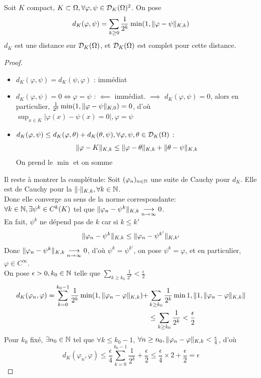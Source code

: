 \documentclass[]{report}
\begin{document}
    \begin{prop}{}{}
        Soit $K$ compact, $K\subset \Omega,\forall \varphi,\psi\in\mathcal{D}_K(\Omega)^2$. On pose 
        \[d_K(\varphi,\psi)=\sum_{k\ge 0}\frac{1}{2^k}\min(1,\lVert \varphi-\psi \rVert_{K,k})\]
        $d_K$ est une distance sur $\mathcal{D}_K(\Omega)$, et $\mathcal{D}_K(\Omega)$ est complet pour cette distance.
    \end{prop}

    \begin{proof}
        \begin{itemize}
            \item $d_K(\varphi,\psi)=d_K(\psi,\varphi)$ : immédiat
            \item $d_K(\varphi,\psi)=0 \iff \varphi=\psi$ : $\impliedby$ immédiat. $\implies$ $d_K(\varphi,\psi)=0$, alors en particulier, $\frac{1}{2^0}\min(1,\lVert \varphi-\psi \rVert_{K,0})=0$, d'où $\sup_{x\in K}\left|\varphi(x)-\psi(x)=0\right|, \varphi=\psi$
            \item $d_K(\varphi,\psi)\le d_K(\varphi,\theta)+d_K(\theta,\psi),\forall \varphi,\psi,\theta \in \mathcal{D}_K(\Omega)$ :\\
            \[\lVert \varphi-K \rVert_{K,k}\le \lVert \varphi-\theta \rVert_{K,k}+\lVert \theta-\psi \rVert_{K,k}\]
            On prend le $\min$ et on somme
        \end{itemize}
        Il reste à montrer la complétude:  Soit $(\varphi_n)_{n\in\mathbb{N}}$ une suite de Cauchy pour $d_K$. Elle est de Cauchy pour la $\lVert \cdot \rVert_{K,k},\forall k\in \mathbb{N}$.\\
        Donc elle converge au sens de la norme correspondante:\\
        $\forall k\in \mathbb{N},\exists \psi^k\in C^k(K)$ tel que $\lVert \varphi_n-\psi^k \rVert_{K,k}\underset{n\to \infty}{\longrightarrow} 0$.\\
        En fait, $\psi^k$ ne dépend pas de $k$ car si $k\le k'$
        \[\lVert \varphi_n-\psi^k \rVert_{K,k}\le \lVert \varphi_n-\psi^{k'} \rVert_{K,k'}\]
        Donc  $\lVert \varphi_n-\psi^k \rVert_{K,k}\underset{n\to \infty}{\longrightarrow}0$, d'où $\psi^k=\psi^{k'}$, on pose $\psi^k=\varphi$, et en particulier, $\varphi\in C^\infty$.\\
        On pose $\epsilon>0,k_0\in \mathbb{N}$ telle que $\sum_{k\ge k_0}\frac{1}{2^k}<\frac{\epsilon}{2}$
        \begin{align*}
            d_K(\varphi_n,\varphi)=\sum_{k=0}^{k_0-1}\frac{1}{2^k} \min(1,\lVert \varphi_n-\varphi \rVert_{K,k})+&\sum_{k\ge k_0}\frac{1}{2^k}\min{1, \lVert 1, \lVert \varphi_n-\varphi \rVert _{K,k} \rVert }\\
            &\le \sum_{k\ge k_0}\frac{1}{2^k}<\frac{\epsilon}{2}
        \end{align*}
        Pour $k_0$ fixé, $\exists n_0\in \mathbb{N}$ tel que  $\forall k\le k_0-1$, $\forall n\ge n_0, \lVert \varphi_n-\varphi \rVert_{K,k}<\frac{\epsilon}{4}$, d'où
        \[d_K(\varphi_n,\varphi)\le \frac{\epsilon}{4}\sum_{k=0}^{k_0-1}\frac{1}{2^k}+\frac{\epsilon}{2}\le \frac{\epsilon}{4}\times 2+\frac{\epsilon}{2}=\epsilon\]
    \end{proof}
\end{document}
